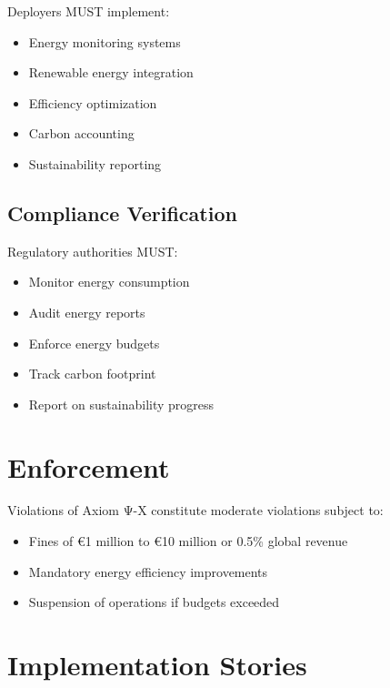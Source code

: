 Deployers MUST implement:

\begin{itemize}
    \item Energy monitoring systems
    \item Renewable energy integration
    \item Efficiency optimization
    \item Carbon accounting
    \item Sustainability reporting
\end{itemize}

\subsection{Compliance Verification}

Regulatory authorities MUST:

\begin{itemize}
    \item Monitor energy consumption
    \item Audit energy reports
    \item Enforce energy budgets
    \item Track carbon footprint
    \item Report on sustainability progress
\end{itemize}

\vspace{0.5cm}

\section{Enforcement}

Violations of Axiom Ψ-X constitute moderate violations subject to:

\begin{itemize}
    \item Fines of €1 million to €10 million or 0.5\% global revenue
    \item Mandatory energy efficiency improvements
    \item Suspension of operations if budgets exceeded
\end{itemize}

\vspace{0.5cm}

\section{Implementation Stories}


